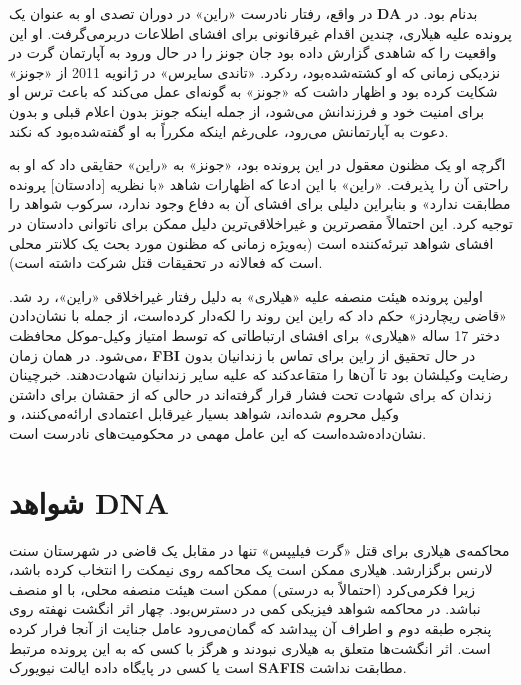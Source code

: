 در واقع، رفتار نادرست «راین» در دوران تصدی او به عنوان یک \textenglish{\textbf{DA}} بدنام بود.
در پرونده علیه هیلاری، چندین اقدام غیرقانونی برای افشای اطلاعات دربر‌می‌گرفت.
او این واقعیت را که شاهدی گزارش داده بود جان جونز را در حال ورود به آپارتمان گرت در نزدیکی زمانی که او کشته‌شده‌بود، ردکرد.
«تاندی سایرس» در ژانویه 2011 از «جونز» شکایت کرده بود و اظهار داشت که «جونز» به گونه‌ای عمل می‌کند که باعث ترس او برای امنیت خود و فرزندانش می‌شود، از جمله اینکه جونز بدون اعلام قبلی و بدون دعوت به آپارتمانش می‌رود، علی‌رغم اینکه مکرراً به او گفته‌شده‌بود که نکند.

اگرچه او یک مظنون معقول در این پرونده بود، «جونز» به «راین» حقایقی داد که او به راحتی آن را پذیرفت.
«راین» با این ادعا که اظهارات شاهد «با نظریه [دادستان] پرونده مطابقت ندارد» و بنابراین دلیلی برای افشای آن به دفاع وجود ندارد، سرکوب شواهد را توجیه کرد.
این احتمالاً مقصرترین و غیراخلاقی‌ترین دلیل ممکن برای ناتوانی دادستان در افشای شواهد تبرئه‌کننده است (به‌ویژه زمانی که مظنون مورد بحث یک کلانتر محلی است که فعالانه در تحقیقات قتل شرکت داشته است).

اولین پرونده هیئت منصفه علیه «هیلاری» به دلیل رفتار غیراخلاقی «راین»، رد شد.
«قاضی ریچاردز» حکم داد که راین این روند را لکه‌دار کرده‌است، از جمله با نشان‌دادن دختر 17 ساله «هیلاری» برای افشای ارتباطاتی که توسط امتیاز وکیل-موکل محافظت می‌شود.
در همان زمان، \textenglish{\textbf{FBI}} در حال تحقیق از راین برای تماس با زندانیان بدون رضایت وکیلشان بود تا آن‌ها را متقاعد‌کند که علیه سایر زندانیان شهادت‌دهند.
خبرچینان زندان که برای شهادت تحت فشار قرار گرفته‌اند در حالی که از حقشان برای داشتن وکیل محروم شده‌اند، شواهد بسیار غیرقابل اعتمادی ارائه‌می‌کنند، و نشان‌داده‌‌شده‌است که این عامل مهمی در محکومیت‌های نادرست است.
\newline
\newline


{
\section*{شواهد DNA}
\label{sec:شواهد DNA}
محاکمه‌ی هیلاری برای قتل «گرت فیلیپس» تنها در مقابل یک قاضی در شهرستان سنت لارنس برگزار‌شد. هیلاری ممکن است یک محاکمه روی نیمکت را انتخاب کرده باشد، زیرا فکر‌می‌کرد (احتمالاً به درستی) ممکن است هیئت منصفه محلی، با او منصف نباشد. در محاکمه شواهد فیزیکی کمی در دسترس‌بود. چهار اثر انگشت نهفته روی پنجره طبقه دوم و اطراف آن پیدا‌شد که گمان‌می‌رود عامل جنایت از آنجا فرار کرده است. اثر انگشت‌ها متعلق به هیلاری نبودند و هرگز با کسی که به این پرونده مرتبط است یا کسی در پایگاه داده ایالت نیویورک \textenglish{\textbf{SAFIS}} مطابقت نداشت.
}


